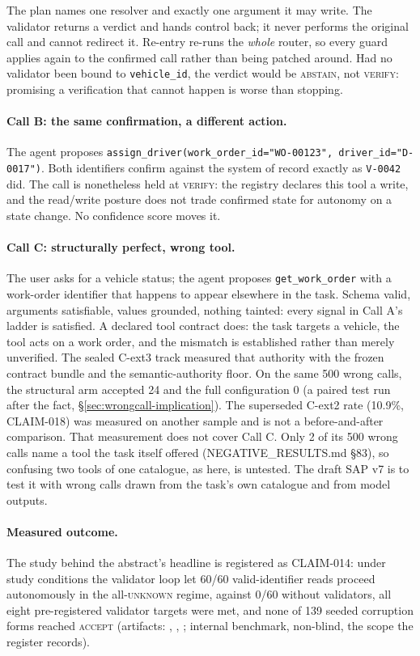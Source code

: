 \documentclass[10pt,twocolumn]{article}
\begin{document}
The plan names one resolver and exactly one argument it may write. The
validator returns a verdict and hands control back; it never performs the
original call and cannot redirect it. Re-entry re-runs the \emph{whole} router,
so every guard applies again to the confirmed call rather than being patched
around. Had no validator been bound to \texttt{vehicle\_id}, the verdict would
be \textsc{abstain}, not \textsc{verify}: promising a verification that cannot
happen is worse than stopping.

\paragraph{Call B: the same confirmation, a different action.} The agent
proposes \texttt{assign\_driver(work\_order\_id="WO-00123",
\texttt{driver\_id}="D-0017")}. Both identifiers confirm against the system of
record exactly as \texttt{V-0042} did. The call is nonetheless held at
\textsc{verify}: the registry declares this tool a write, and the read/write
posture does not trade confirmed state for autonomy on a state change. No
confidence score moves it.

\paragraph{Call C: structurally perfect, wrong tool.} The user asks for a
vehicle status; the agent proposes \texttt{get\_work\_order} with a work-order
identifier that happens to appear elsewhere in the task. Schema valid,
arguments satisfiable, values grounded, nothing tainted: every signal in
Call A's ladder is satisfied. A declared
tool contract does: the task targets a vehicle, the tool acts on a work order,
and the mismatch is established rather than merely unverified. The sealed
C-ext3 track measured that authority with the frozen contract bundle and the
semantic-authority floor. On the same 500 wrong calls, the structural arm
accepted 24 and the full configuration 0 (a paired test run after the fact,
\S\ref{sec:wrongcall-implication}). The superseded C-ext2 rate (10.9\%,
CLAIM-018) was measured on another sample and is not a before-and-after
comparison. That measurement does not cover Call C.
Only 2 of its 500 wrong calls name a tool the task itself offered
(NEGATIVE\_RESULTS.md \S83), so confusing two tools of one catalogue, as
here, is untested. The draft SAP v7 is to test it with wrong calls drawn
from the task's own catalogue and from model outputs.

\paragraph{Measured outcome.} The study behind the abstract's headline
is registered as CLAIM-014: under study conditions the validator loop
let 60/60 valid-identifier reads proceed autonomously in the
all-\textsc{unknown} regime, against 0/60 without validators, all eight pre-registered validator targets were met, and none
of 139 seeded corruption forms reached \textsc{accept} (artifacts:
,
,
; internal
benchmark, non-blind, the scope the register records).
\end{document}
